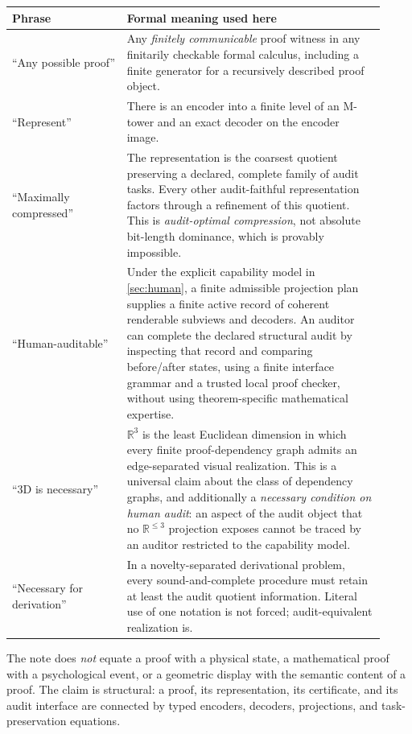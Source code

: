 \documentclass[11pt]{article}
\newcommand{\R}{\mathbb R}
\theoremstyle{plain}
\theoremstyle{definition}
\theoremstyle{remark}
\begin{document}
\begin{center}
\begin{tabular}{p{0.29\linewidth}p{0.63\linewidth}}
\toprule
Phrase & Formal meaning used here \\
\midrule
``Any possible proof'' & Any \emph{finitely communicable} proof witness in any finitarily checkable formal calculus, including a finite generator for a recursively described proof object. \\
``Represent'' & There is an encoder into a finite level of an M-tower and an exact decoder on the encoder image. \\
``Maximally compressed'' & The representation is the coarsest quotient preserving a declared, complete family of audit tasks.  Every other audit-faithful representation factors through a refinement of this quotient.  This is \emph{audit-optimal compression}, not absolute bit-length dominance, which is provably impossible. \\
``Human-auditable'' & Under the explicit capability model in \cref{sec:human}, a finite admissible projection plan supplies a finite active record of coherent renderable subviews and decoders.  An auditor can complete the declared structural audit by inspecting that record and comparing before/after states, using a finite interface grammar and a trusted local proof checker, without using theorem-specific mathematical expertise. \\
``3D is necessary'' & $\R^3$ is the least Euclidean dimension in which every finite proof-dependency graph admits an edge-separated visual realization.  This is a universal claim about the class of dependency graphs, and additionally a \emph{necessary condition on human audit}: an aspect of the audit object that no $\R^{\le 3}$ projection exposes cannot be traced by an auditor restricted to the capability model. \\
``Necessary for derivation'' & In a novelty-separated derivational problem, every sound-and-complete procedure must retain at least the audit quotient information.  Literal use of one notation is not forced; audit-equivalent realization is. \\
\bottomrule
\end{tabular}
\end{center}

The note does \emph{not} equate a proof with a physical state, a mathematical proof with a psychological event, or a geometric display with the semantic content of a proof.  The claim is structural: a proof, its representation, its certificate, and its audit interface are connected by typed encoders, decoders, projections, and task-preservation equations.
\end{document}
